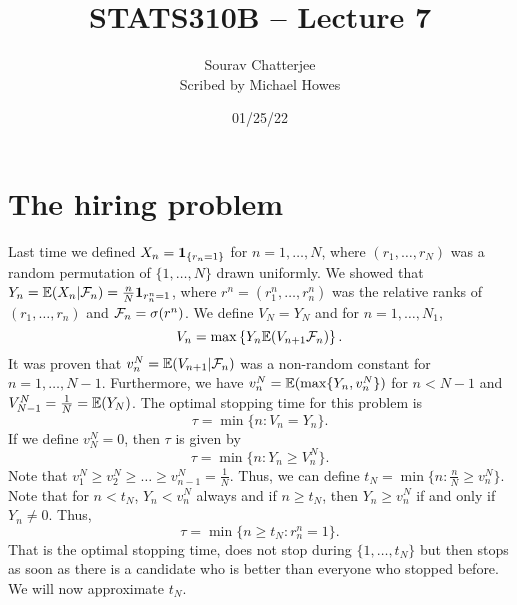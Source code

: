 




\title{STATS310B -- Lecture 7}
\author{Sourav Chatterjee\\ Scribed by Michael Howes}
\date{01/25/22}

\pagestyle{fancy}
\fancyhf{}


\maketitle
\tableofcontents
\section{The hiring problem}
 Last time we defined $X_n = {{\bf 1}}_{\{r_n =1 \}}$ for $n=1,\ldots,N$, where $(r_1,\ldots,r_N)$ was a random permutation of $\{1,\ldots,N\}$ drawn uniformly. We showed that $Y_n = {\mathbb{E}}(X_n|{\mathcal{F}}_n) = \frac{n}{N}{{\bf 1}}_{r_n^n =1 }$, where $r^n =(r_1^n,\ldots,r_n^n)$ was the relative ranks of $(r_1,\ldots,r_n)$ and ${\mathcal{F}}_n = \sigma(r^n)$. We define $V_N = Y_N$ and for $n=1,\ldots,N_1$,
 \[V_n = \max\left\{Y_n {\mathbb{E}}(V_{n+1}{\mathcal{F}}_n)\right\}. \]
 It was proven that $v_n^N = {\mathbb{E}}(V_{n+1}|{\mathcal{F}}_n)$ was a non-random constant for $n=1,\ldots,N-1$. Furthermore, we have $v_n^N = {\mathbb{E}}(\max\{Y_n, v_n^N\})$ for $n<N-1$ and $V^N_{N-1}= \frac{1}{N} = {\mathbb{E}}(Y_N)$. The optimal stopping time for this problem is
 \[\tau = \min\{n : V_n = Y_n\}. \]
 If we define $v_N^N = 0$, then $\tau$ is given by
 \[\tau = \min\{n : Y_n \ge V_n^N\}. \]
 Note that $v_1^N \ge v_2^N \ge \ldots \ge v_{n-1}^N = \frac{1}{N}$. Thus, we can define $t_N = \min\{n : \frac{n}{N} \ge v_n^N\}$. Note that for $n < t_N$, $Y_n < v_n^N$ always and if $n \ge t_N$, then $Y_n \ge v_n^N$ if and only if $Y_n \neq 0$. Thus,
 \[\tau = \min\{n\ge t_N : r_n^n = 1\}.  \]
 That is the optimal stopping time, does not stop during $\{1,\ldots,t_N\}$ but then stops as soon as there is a candidate who is better than everyone who stopped before. We will now approximate $t_N$. 
 
